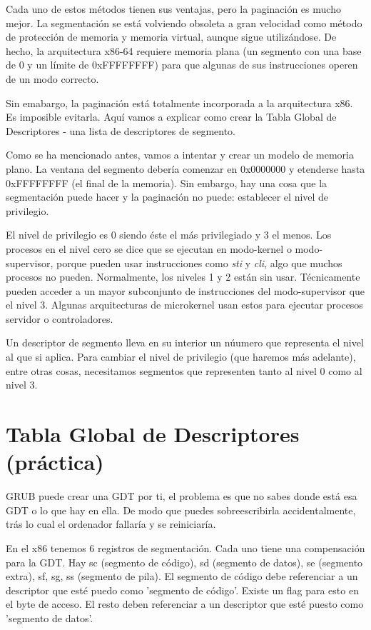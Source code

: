 \documentclass{report}
\begin{document}
Cada uno de estos m\'{e}todos tienen sus ventajas, pero la paginaci\'{o}n es mucho mejor. La segmentaci\'{o}n se est\'{a} volviendo obsoleta a gran velocidad como m\'{e}todo de protecci\'{o}n de memoria y memoria virtual, aunque sigue utiliz\'{a}ndose. De hecho, la arquitectura x86-64 requiere memoria plana (un segmento con una base de 0 y un l\'{i}mite de 0xFFFFFFFF) para que algunas de sus instrucciones operen de un modo correcto.

Sin emabargo, la paginaci\'{o}n est\'{a} totalmente incorporada a la arquitectura x86. Es imposible evitarla. Aqu\'{i} vamos a explicar como crear la Tabla Global de Descriptores - una lista de descriptores de segmento.

Como se ha mencionado antes, vamos a intentar y crear un modelo de memoria plano. La ventana del segmento deber\'{i}a comenzar en 0x0000000 y etenderse hasta 0xFFFFFFFF (el final de la memoria). Sin embargo, hay una cosa que la segmentaci\'{o}n puede hacer y la paginaci\'{o}n no puede: establecer el nivel de privilegio.

El nivel de privilegio es 0 siendo \'{e}ste el m\'{a}s privilegiado y 3 el menos. Los procesos en el nivel cero se dice que se ejecutan en modo-kernel o modo-supervisor, porque pueden usar instrucciones como \textit{sti} y \textit{cli}, algo que muchos procesos no pueden. Normalmente, los niveles 1 y 2 est\'{a}n sin usar. T\'{e}cnicamente pueden acceder a un mayor subconjunto de instrucciones del modo-supervisor que el nivel 3. Algunas arquitecturas de microkernel usan estos para ejecutar procesos servidor o controladores.

Un descriptor de segmento lleva en su interior un n\'u{u}mero que representa el nivel al que si aplica. Para cambiar el nivel de privilegio (que haremos m\'{a}s adelante), entre otras cosas, necesitamos segmentos que representen tanto al nivel 0 como al nivel 3.

\section{Tabla Global de Descriptores (pr\'{a}ctica)}

GRUB puede crear una GDT por ti, el problema es que no sabes donde est\'{a} esa GDT o lo que hay en ella. De modo que puedes sobreescribirla accidentalmente, tr\'{a}s lo cual el ordenador fallar\'{i}a y se reiniciar\'{i}a.

En el x86 tenemos 6 registros de segmentaci\'{o}n. Cada uno tiene una compensaci\'{o}n para la GDT. Hay sc (segmento de c\'{o}digo), sd (segmento de datos), se (segmento extra), sf, sg, ss (segmento de pila). El segmento de c\'{o}digo debe referenciar a un descriptor que est\'{e} puedo como 'segmento de c\'{o}digo'. Existe un flag para esto en el byte de acceso. El resto deben referenciar a un descriptor que est\'{e} puesto como 'segmento de datos'.
\end{document}
